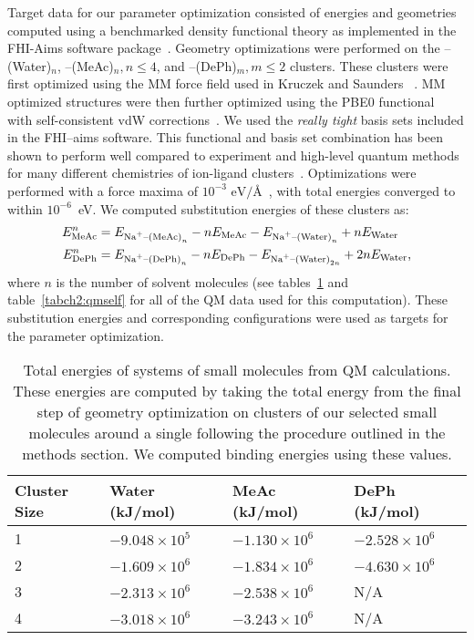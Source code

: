 Target data for our parameter optimization consisted of energies and geometries 
computed using a benchmarked density functional theory as implemented in  
the FHI-Aims software package~\cite{fhiaims}. 
Geometry optimizations were performed on the \na--(Water)$_{n}$,
\na--(MeAc)$_{n}, n\leq4$, and \na--(DePh)$_m, m\leq2$ clusters.
These clusters were first optimized using the MM force field used in 
Kruczek \etal and Saunders \etal~\cite{kruczek:2017,saunders:2019}. 
MM optimized structures were then further
optimized using the PBE0 functional~\cite{perdew:1996:generalized,adamo:1999:toward} 
with self-consistent vdW corrections~\cite{tkatchenko:2009}. 
We used the \emph{really tight} basis sets included in the FHI--aims software. 
This functional and basis set combination 
has been shown to perform well compared to
experiment and high-level quantum methods for many different chemistries of ion-ligand clusters~\cite{wineman:2019,wineman:2020:transferable,wineman:2020:improved}. 
Optimizations were performed with a force 
maxima of $10^{-3}$ $\text{eV}/\text{\AA}$~, with total energies converged
to within $10^{-6}$~eV. 
We computed substitution energies of these clusters as:
\begin{equation}
    \begin{split}
        E^{n}_\text{MeAc}&=E_{\text{Na\textsuperscript{+}--(MeAc)}_n}-nE_\text{MeAc}-E_{\text{Na\textsuperscript{+}--(Water)}_n}+nE_\text{Water}\\ 
        E^{n}_\text{DePh}&=E_{\text{Na\textsuperscript{+}--(DePh)}_n}-nE_\text{DePh}-E_{\text{Na\textsuperscript{+}--(Water)}_{2n}}+2nE_\text{Water}\text{,}
    \end{split}
    \label{eq:substitution}
\end{equation}
where $n$ is the number of solvent molecules
(see tables~\ref{tabch2:qmbinding} and table~\ref{tabch2:qmself} for all of the QM
data used for this computation).  These substitution energies and
corresponding configurations were used as targets for the parameter
optimization.
\begin{table}[h!tb]
    \caption[QM Total energies of small molecules]{Total energies of systems of small molecules from QM calculations. 
These energies are computed by taking the total energy from the final step of geometry optimization 
on clusters of our selected small molecules around a single \na following
the procedure outlined in the methods section. We computed binding energies using these values.}
\label{tabch2:qmbinding}
\begin{tabularx}{\textwidth}{X|X|X|X}
    Cluster Size & Water (kJ/mol)& MeAc (kJ/mol) & DePh (kJ/mol)\\\hline
    1&$-9.048\times10^{5}$&$-1.130\times10^{6}$&$-2.528\times10^{6}$\\ \hline
    2&$-1.609\times10^{6}$&$-1.834\times10^{6}$&$-4.630\times10^{6}$\\\hline
    3&$-2.313\times10^{6}$&$-2.538\times10^{6}$& N/A \\\hline
    4&$-3.018\times10^{6}$&$-3.243\times10^{6}$& N/A \\\hline
\end{tabularx}
\end{table}

